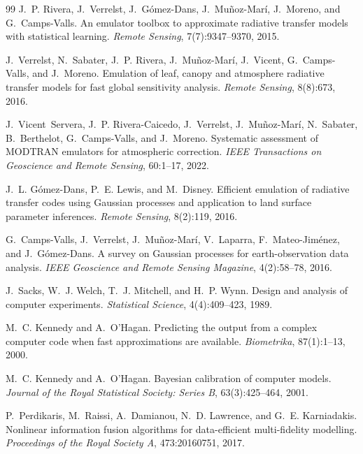 \begin{thebibliography}{99}
J.~P. Rivera, J.~Verrelst, J.~G\'omez-Dans, J.~Mu\~noz-Mar\'i, J.~Moreno, and G.~Camps-Valls.
\newblock An emulator toolbox to approximate radiative transfer models with statistical
learning.
\newblock \emph{Remote Sensing}, 7(7):9347--9370, 2015.

J.~Verrelst, N.~Sabater, J.~P. Rivera, J.~Mu\~noz-Mar\'i, J.~Vicent, G.~Camps-Valls, and
J.~Moreno.
\newblock Emulation of leaf, canopy and atmosphere radiative transfer models for fast global
sensitivity analysis.
\newblock \emph{Remote Sensing}, 8(8):673, 2016.

J.~Vicent~Servera, J.~P. Rivera-Caicedo, J.~Verrelst, J.~Mu\~noz-Mar\'i, N.~Sabater, B.~Berthelot,
G.~Camps-Valls, and J.~Moreno.
\newblock Systematic assessment of {MODTRAN} emulators for atmospheric correction.
\newblock \emph{IEEE Transactions on Geoscience and Remote Sensing}, 60:1--17, 2022.

J.~L. G\'omez-Dans, P.~E. Lewis, and M.~Disney.
\newblock Efficient emulation of radiative transfer codes using {Gaussian} processes and
application to land surface parameter inferences.
\newblock \emph{Remote Sensing}, 8(2):119, 2016.

G.~Camps-Valls, J.~Verrelst, J.~Mu\~noz-Mar\'i, V.~Laparra, F.~Mateo-Jim\'enez, and
J.~G\'omez-Dans.
\newblock A survey on {Gaussian} processes for earth-observation data analysis.
\newblock \emph{IEEE Geoscience and Remote Sensing Magazine}, 4(2):58--78, 2016.

J.~Sacks, W.~J. Welch, T.~J. Mitchell, and H.~P. Wynn.
\newblock Design and analysis of computer experiments.
\newblock \emph{Statistical Science}, 4(4):409--423, 1989.

M.~C. Kennedy and A.~O'Hagan.
\newblock Predicting the output from a complex computer code when fast approximations are
available.
\newblock \emph{Biometrika}, 87(1):1--13, 2000.

M.~C. Kennedy and A.~O'Hagan.
\newblock Bayesian calibration of computer models.
\newblock \emph{Journal of the Royal Statistical Society: Series B}, 63(3):425--464, 2001.

P.~Perdikaris, M.~Raissi, A.~Damianou, N.~D. Lawrence, and G.~E. Karniadakis.
\newblock Nonlinear information fusion algorithms for data-efficient multi-fidelity modelling.
\newblock \emph{Proceedings of the Royal Society A}, 473:20160751, 2017.


\end{thebibliography}
